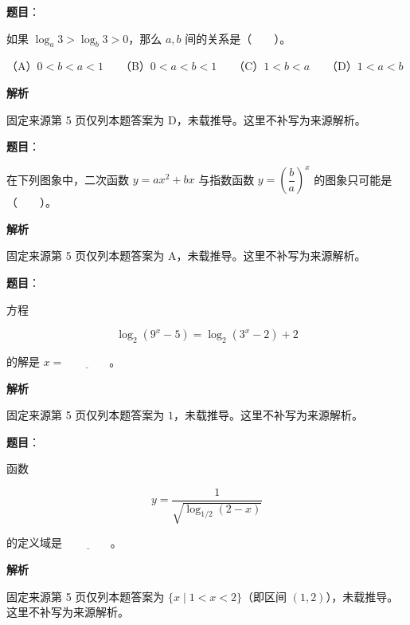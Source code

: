 \begin{answer}

\textbf{题目}：

如果 $\log_a3>\log_b3>0$，那么 $a,b$ 间的关系是\mbox{（　　）}。

（A）$0<b<a<1$　　（B）$0<a<b<1$　　（C）$1<b<a$　　（D）$1<a<b$

\textbf{解析}

固定来源第 5 页仅列本题答案为 D，未载推导。这里不补写为来源解析。


\end{answer}
\begin{answer}

\textbf{题目}：

在下列图象中，二次函数 $y=ax^2+bx$ 与指数函数 $y=\left(\dfrac{b}{a}\right)^x$ 的图象只可能是\mbox{（　　）}。
\nopagebreak[4]
\begin{center}\end{center}
\nopagebreak[4]
\textbf{解析}

固定来源第 5 页仅列本题答案为 A，未载推导。这里不补写为来源解析。


\end{answer}
\begin{answer}

\textbf{题目}：

方程

\nopagebreak[4]
\[
\log_2(9^x-5)=\log_2(3^x-2)+2
\]

的解是 $x=\underline{\qquad\qquad}$。

\textbf{解析}

固定来源第 5 页仅列本题答案为 $1$，未载推导。这里不补写为来源解析。


\end{answer}
\begin{answer}

\textbf{题目}：

函数

\nopagebreak[4]
\[
y=\dfrac{1}{\sqrt{\log_{1/2}(2-x)}}
\]

的定义域是 $\underline{\qquad\qquad}$。

\textbf{解析}

固定来源第 5 页仅列本题答案为 $\{x\mid 1<x<2\}$（即区间 $(1,2)$），未载推导。这里不补写为来源解析。


\end{answer}
